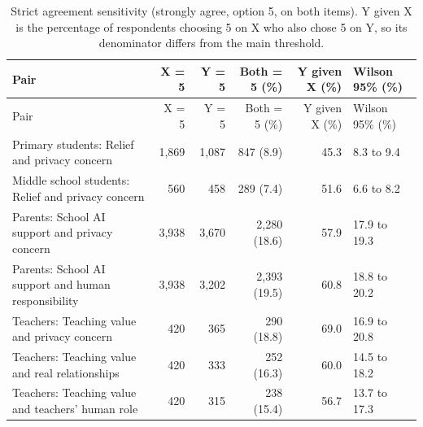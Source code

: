 \begin{longtable}{@{}p{}rrrrl@{}}
\caption{Strict agreement sensitivity (strongly agree, option 5, on both items). Y given X is the percentage of respondents choosing 5 on X who also chose 5 on Y, so its denominator differs from the main threshold.}\label{tab:joint_strict}\\
\toprule Pair & X = 5 & Y = 5 & Both = 5 (\%) & Y given X (\%) & Wilson 95\% (\%) \\ \midrule \endfirsthead
\toprule Pair & X = 5 & Y = 5 & Both = 5 (\%) & Y given X (\%) & Wilson 95\% (\%) \\ \midrule \endhead
\bottomrule \endfoot
Primary students: Relief and privacy concern & 1{,}869 & 1{,}087 & 847 (8.9) & 45.3 & 8.3 to 9.4 \\
Middle school students: Relief and privacy concern & 560 & 458 & 289 (7.4) & 51.6 & 6.6 to 8.2 \\
Parents: School AI support and privacy concern & 3{,}938 & 3{,}670 & 2{,}280 (18.6) & 57.9 & 17.9 to 19.3 \\
Parents: School AI support and human responsibility & 3{,}938 & 3{,}202 & 2{,}393 (19.5) & 60.8 & 18.8 to 20.2 \\
Teachers: Teaching value and privacy concern & 420 & 365 & 290 (18.8) & 69.0 & 16.9 to 20.8 \\
Teachers: Teaching value and real relationships & 420 & 333 & 252 (16.3) & 60.0 & 14.5 to 18.2 \\
Teachers: Teaching value and teachers' human role & 420 & 315 & 238 (15.4) & 56.7 & 13.7 to 17.3 \\
\end{longtable}

